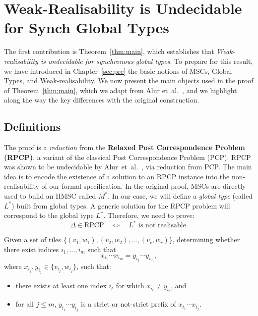 \chapter{Weak-Realisability is Undecidable for Synch Global Types}\label{sec:proof}

The first contribution is Theorem~\ref{thm:main}, 
which establishes that \emph{Weak-realisability is undecidable for 
synchronous global types}. To prepare for this result, we have introduced 
in Chapter~\ref{sec:pre} the basic notions of MSCs, Global Types, and 
Weak-realisability.  
We now present the main objects used in the proof of 
Theorem~\ref{thm:main}, which we adapt from 
Alur et~al.~\cite{alur2005realizability}, and we highlight along the way 
the key differences with the original construction.

\section{Definitions}
The proof is a \emph{reduction} from the
\textbf{Relaxed Post Correspondence Problem (RPCP)}, a variant of
the classical Post Correspondence Problem (PCP). 
RPCP was shown to be undecidable by
Alur~et~al.~\cite{alur2005realizability}, via reduction from PCP.
The main idea is to encode the existence of a
solution to an RPCP instance into the non-realisability of our formal
specification. In the original proof, MSCs are directly used to build an
HMSC called $M^*$. In our case, we will define a
\emph{global type} (called $L^*$) built from global types.
A generic solution for the RPCP problem will correspond to the global
type $L^*$. Therefore, we need to prove:
$$
\Delta \in \text{RPCP} \quad\iff\quad L^* \text{ is not realisable}.
$$

\bigskip

\begin{definition}
	Given a set of tiles $\{(v_1, w_1), (v_2, w_2), ..., (v_r, w_r)\}$, 
	determining whether there exist indices $i_1, ..., i_m$ such that
	$$x_{i_1}\cdots x_{i_m} = y_{i_1}\cdots y_{i_m},$$
	where $x_{i_j}, y_{i_j} \in \{v_{i_j}, w_{i_j}\}$, such that:
	\begin{itemize}
		\item there exists at least one index $i_\ell$ for which $x_{i_\ell}\neq y_{i_\ell}$, and
		\item for all $j \leq m$, $y_{i_1}\cdots y_{i_j}$ is a strict or 
		not-strict prefix of $x_{i_1}\cdots x_{i_j}$.
	\end{itemize}
\end{definition}

